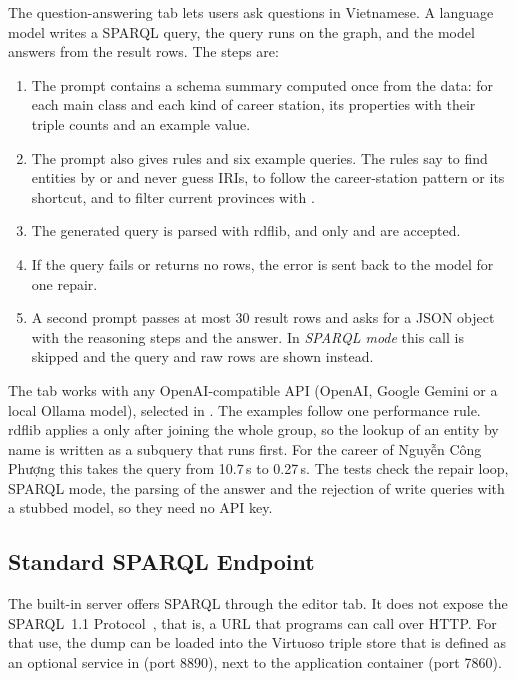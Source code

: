 The question-answering tab lets users ask questions in Vietnamese. A language
model writes a SPARQL query, the query runs on the graph, and the model answers
from the result rows. The steps are:
\begin{enumerate}
  \item The prompt contains a schema summary computed once from the data:
        for each main class and each kind of career station, its properties
        with their triple counts and an example value.
  \item The prompt also gives rules and six example queries. The rules say to
        find entities by  or  and never
        guess IRIs, to follow the career-station pattern or its
         shortcut, and to filter current provinces with
        .
  \item The generated query is parsed with rdflib, and only  and
         are accepted.
  \item If the query fails or returns no rows, the error is sent back to the
        model for one repair.
  \item A second prompt passes at most 30 result rows and asks for a JSON
        object with the reasoning steps and the answer. In \emph{SPARQL mode}
        this call is skipped and the query and raw rows are shown instead.
\end{enumerate}
The tab works with any OpenAI-compatible API (OpenAI, Google Gemini or a local
Ollama model), selected in . The examples follow one performance rule.
rdflib applies a  only after joining the whole group, so the
lookup of an entity by name is written as a subquery that runs first. For the
career of Nguyễn Công Phượng this takes the query from 10.7\,s to 0.27\,s. The
tests check the repair loop, SPARQL mode, the parsing of the answer and the
rejection of write queries with a stubbed model, so they need no API key.

\subsection{Standard SPARQL Endpoint}
\label{sec:endpoint}

The built-in server offers SPARQL through the editor tab. It does not expose
the SPARQL~1.1 Protocol~\cite{feigenbaum2013protocol}, that is, a
 URL that programs can call over HTTP. For that use, the dump can
be loaded into the Virtuoso triple store that is defined as an optional
service in  (port 8890), next to the application
container (port 7860).
